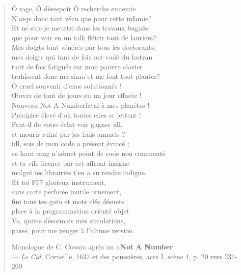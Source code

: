 \begin{quote}
\og Ô rage, Ô désespoir Ô recherche ennemie\\
N'ai-je donc tant vécu que pour cette infamie?\\
Et ne suis-je meurtri dans les travaux bugués\\
que pour voir en un talk flétrir tant de lauriers? \\
Mes doigts tant vénérés par tous les doctorants, \\
mes doigts qui tant de fois ont codé du fortran\\
tant de fois fatigués sur mon pauvre clavier\\
trahissent donc ma simu et me font tout planter? \\
Ô cruel souvenir d'exos solutionnés !\\
Œuvre de tant de jours en un jour effacée !\\
Nouveau \og Not A Number\fg fatal à mes planètes !\\
Précipice élevé d'où toutes elles se jettent !\\
Faut-il de votre éclat voir gagner idl, \\
et mourir ruiné par les frais annuels ? \\
idl, sois de mon code a présent évincé ; \\
ce haut rang n'admet point de code non commenté\\
et ta vile licence par cet affront insigne\\
malgré tes librairies t'en a su rendre indigne. \\
Et toi F77 glorieux instrument, \\
sans carte perforée inutile ornement, \\
fini tous tes goto et mots clés désuets\\
place à la programmation orienté objet\\
Va, quitte désormais mes simulations,\\
passe, pour me venger à l'ultime version.\fg

Monologue de C. Cossou après un n\ieme \textbf{Not A Number}\\
  --- \textit{Le Cid}, Corneille, 1637 et des poussières, acte I, scène 4, p. 20 vers 237-260
\end{quote}
